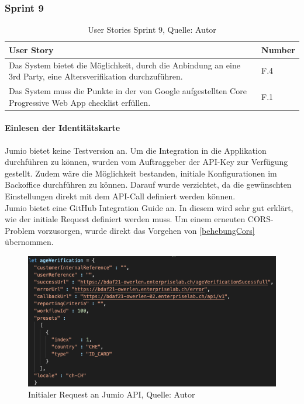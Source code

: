 \subsubsection{Sprint 9}
\begin{table}[H]
	\setlength\extrarowheight{2pt} %
	\begin{tabularx}{\textwidth}{|X|l|}
		\hline
		\textbf{User Story} & \textbf{Number} \\
		\hline
		Das System bietet die Möglichkeit, durch die Anbindung an eine 3rd Party, eine Altersverifikation durchzuführen.& F.4\\
		\hline
		Das System muss die Punkte in der von Google aufgestellten Core Progressive Web App checklist erfüllen. & F.1\\
		\hline
	\end{tabularx} 
	\caption[User Stories Sprint 9]{User Stories Sprint 9, Quelle: Autor}
\end{table}\label{userStoriesSprint9}

\paragraph{Einlesen der Identitätskarte}
Jumio bietet keine Testversion an. Um die Integration in die Applikation durchführen zu können, wurden vom Auftraggeber der API-Key zur Verfügung gestellt. Zudem wäre die Möglichkeit bestanden, initiale Konfigurationen im Backoffice durchführen zu können. Darauf wurde verzichtet, da die gewünschten Einstellungen direkt mit dem API-Call definiert werden können. \\
Jumio bietet eine GitHub Integration Guide an. In diesem wird sehr gut erklärt, wie der initiale Request definiert werden muss. Um einem erneuten CORS-Problem vorzusorgen, wurde direkt das Vorgehen von \ref{behebungCors} übernommen. \\

 \begin{figure}[H]
	\centering
	\includegraphics[scale=0.5]{images/initRequestJumio.PNG}
	\caption[Initialer Request an Jumio API]{Initialer Request an Jumio API, Quelle: Autor}
	\label{img: jumioInitialRequest}
\end{figure} 

